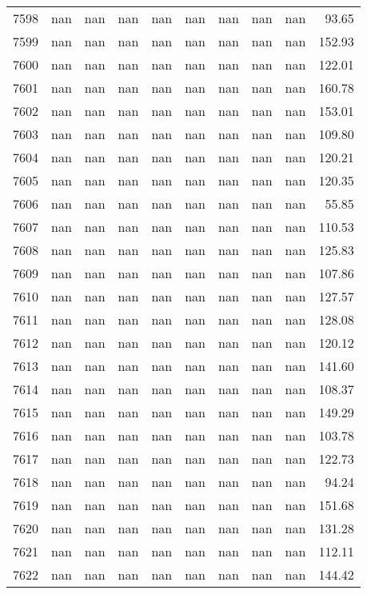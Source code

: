 \begin{tabular}{lrrrrrrrrr}
7598 & nan & nan & nan & nan & nan & nan & nan & nan & 93.65 \\
7599 & nan & nan & nan & nan & nan & nan & nan & nan & 152.93 \\
7600 & nan & nan & nan & nan & nan & nan & nan & nan & 122.01 \\
7601 & nan & nan & nan & nan & nan & nan & nan & nan & 160.78 \\
7602 & nan & nan & nan & nan & nan & nan & nan & nan & 153.01 \\
7603 & nan & nan & nan & nan & nan & nan & nan & nan & 109.80 \\
7604 & nan & nan & nan & nan & nan & nan & nan & nan & 120.21 \\
7605 & nan & nan & nan & nan & nan & nan & nan & nan & 120.35 \\
7606 & nan & nan & nan & nan & nan & nan & nan & nan & 55.85 \\
7607 & nan & nan & nan & nan & nan & nan & nan & nan & 110.53 \\
7608 & nan & nan & nan & nan & nan & nan & nan & nan & 125.83 \\
7609 & nan & nan & nan & nan & nan & nan & nan & nan & 107.86 \\
7610 & nan & nan & nan & nan & nan & nan & nan & nan & 127.57 \\
7611 & nan & nan & nan & nan & nan & nan & nan & nan & 128.08 \\
7612 & nan & nan & nan & nan & nan & nan & nan & nan & 120.12 \\
7613 & nan & nan & nan & nan & nan & nan & nan & nan & 141.60 \\
7614 & nan & nan & nan & nan & nan & nan & nan & nan & 108.37 \\
7615 & nan & nan & nan & nan & nan & nan & nan & nan & 149.29 \\
7616 & nan & nan & nan & nan & nan & nan & nan & nan & 103.78 \\
7617 & nan & nan & nan & nan & nan & nan & nan & nan & 122.73 \\
7618 & nan & nan & nan & nan & nan & nan & nan & nan & 94.24 \\
7619 & nan & nan & nan & nan & nan & nan & nan & nan & 151.68 \\
7620 & nan & nan & nan & nan & nan & nan & nan & nan & 131.28 \\
7621 & nan & nan & nan & nan & nan & nan & nan & nan & 112.11 \\
7622 & nan & nan & nan & nan & nan & nan & nan & nan & 144.42 \\

\end{tabular}
